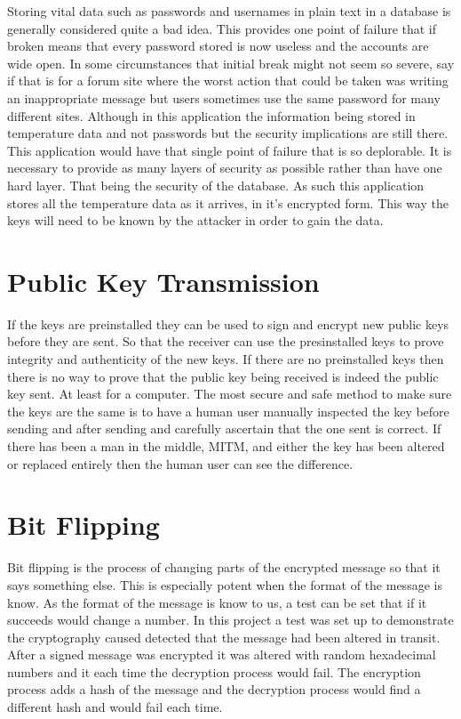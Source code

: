 Storing vital data such as passwords and usernames in plain text in a database is generally considered quite a bad idea. This provides one point of failure that if broken means that every password stored is now useless and the accounts are wide open. In some circumstances that initial break might not seem so severe, say if that is for a forum site where the worst action that could be taken was writing an inappropriate message but users sometimes use the same password for many different sites. Although in this application the information being stored in temperature data and not passwords but the security implications are still there. This application would have that single point of failure that is so deplorable. It is necessary to provide as many layers of security as possible rather than have one hard layer. That being the security of the database. As such this application stores all the temperature data as it arrives, in it's encrypted form. This way the keys will need to be known by the attacker in order to gain the data.

\section{Public Key Transmission}

If the keys are preinstalled they can be used to sign and encrypt new public keys before they are sent. So that the receiver can use the presinstalled keys to prove integrity and authenticity of the new keys. If there are no preinstalled keys then there is no way to prove that the public key being received is indeed the public key sent. At least for a computer. The most secure and safe method to make sure the keys are the same is to have a human user manually inspected the key before sending and after sending and carefully ascertain that the one sent is correct. If there has been a man in the middle, MITM, and either the key has been altered or replaced entirely then the human user can see the difference. 

\section{Bit Flipping}

Bit flipping is the process of changing parts of the encrypted message so that it says something else. This is especially potent when the format of the message is know. As the format of the message is know to us, a test can be set that if it succeeds would change a number. In this project a test was set up to demonstrate the cryptography caused detected that the message had been altered in transit. After a signed message was encrypted it was altered with random hexadecimal numbers and it each time the decryption process would fail. The encryption process adds a hash of the message and the decryption process would find a different hash and would fail each time.

